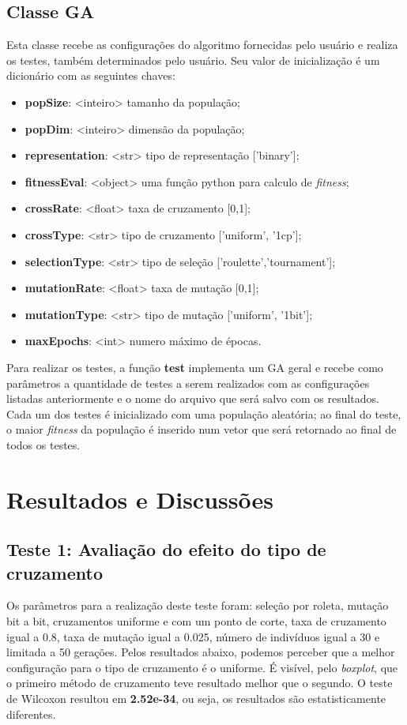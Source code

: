 \documentclass[11pt,a4paper]{article}
\begin{document}
\subsection{Classe GA}
Esta classe recebe as configurações do algoritmo fornecidas pelo usuário e realiza os testes, também determinados pelo usuário. Seu valor de inicialização é um dicionário com as seguintes chaves:
\begin{itemize}
\footnotesize
\setlength\itemsep{0em}
\item \textbf{popSize}: <inteiro> tamanho da população;
\item \textbf{popDim}: <inteiro> dimensão da população;
\item \textbf{representation}: <str> tipo de representação ['binary'];
\item \textbf{fitnessEval}: <object> uma função python para calculo de \textit{fitness};
\item \textbf{crossRate}: <float> taxa de cruzamento [0,1];
\item \textbf{crossType}: <str> tipo de cruzamento ['uniform', '1cp'];
\item \textbf{selectionType}: <str> tipo de seleção ['roulette','tournament'];
\item \textbf{mutationRate}: <float> taxa de mutação [0,1];
\item \textbf{mutationType}: <str> tipo de mutação ['uniform', '1bit'];
\item \textbf{maxEpochs}: <int> numero máximo de épocas.
\end{itemize}

Para realizar os testes, a função \textbf{test} implementa um GA geral e recebe como parâmetros a quantidade de testes a serem realizados com as configurações listadas anteriormente e o nome do arquivo que será salvo com os resultados. Cada um dos testes é inicializado com uma população aleatória; ao final do teste, o maior \textit{fitness} da população é inserido num vetor que será retornado ao final de todos os testes.

\section{Resultados e Discussões}
\subsection{Teste 1: Avaliação do efeito do tipo de cruzamento}
Os parâmetros para a realização deste teste foram: seleção por roleta, mutação bit a bit, cruzamentos uniforme e com um ponto de corte, taxa de cruzamento igual a 0.8, taxa de mutação igual a 0.025, número de indivíduos igual a 30 e limitada a 50 gerações. Pelos resultados abaixo, podemos perceber que a melhor configuração para o tipo de cruzamento é o uniforme. É visível, pelo \textit{boxplot}, que o primeiro método de cruzamento teve resultado melhor que o segundo. O teste de Wilcoxon resultou em \mbox{\textbf{2.52e-34}}, ou seja, os resultados são estatisticamente diferentes.\\
\end{document}
